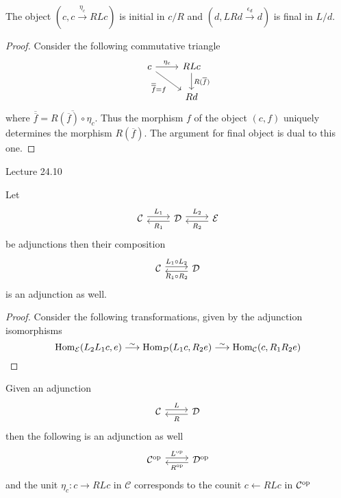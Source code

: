 \begin{prop}
\label{initial_final_comma_category}
    The object $(c,c \xrightarrow{\eta_c} RLc)$ is initial in $c/R$ and
    $(d, LRd \xrightarrow{\epsilon_d} d)$ is final in $L/d$.
\end{prop}

\begin{proof}
    Consider the following commutative triangle
        \[
        \begin{tikzcd}
            c 
            \arrow[r, " \eta_c "] 
            \arrow[rd, "\overline{\overline{f}}=f"']
            &
            RLc
            \arrow[d,"R(\overline{f})"]
            \\
            &
            Rd
        \end{tikzcd}
        \]
    where $\overline{\overline{f}}=\overline{R(\overline{f})\circ \eta_c}$. 
    Thus the morphism $f$ of the object $(c,f)$ uniquely determines the morphism $R(\overline{f})$. 
    The argument for final object is dual to this one.
\end{proof}

Lecture 24.10

\begin{prop}
    Let 
    \[
    \begin{tikzcd}
        \mathcal{C}
        \arrow[r, shift left, "L_1"]
        &
        \mathcal{D}
        \arrow[l, shift left, "R_1"]
        \arrow[r, shift left, "L_2"]
        &
        \mathcal{E}
        \arrow[l, shift left, "R_2"]
    \end{tikzcd}
    \]
    be adjunctions then their composition
    \[
    \begin{tikzcd}
        \mathcal{C}
        \arrow[r, shift left, "L_1\circ L_2"]
        &
        \mathcal{D}
        \arrow[l, shift left, "R_1\circ R_2"]
    \end{tikzcd}
    \]
    is an adjunction as well.
\end{prop}

\begin{proof}
Consider the following transformations, given by the adjunction isomorphisms
    \[
    \Hom_{\mathcal{E}}(L_2L_1c,e) \isomorphism \Hom_{\mathcal{D}}(L_1c,R_2e) \isomorphism \Hom_{\mathcal{C}}(c,R_1R_2e)
    \]
\end{proof}

\begin{rmk}
    Given an adjunction 
    \[
    \begin{tikzcd}
        \mathcal{C}
        \arrow[r, shift left, "L"]
        &
        \mathcal{D}
        \arrow[l, shift left, "R"]
    \end{tikzcd}
    \]
    then the following is an adjunction as well
    \[
    \begin{tikzcd}
        \mathcal{C^{\op}}
        \arrow[r, shift left, "L^{\op}"]
        &
        \mathcal{D^{\op}}
        \arrow[l, shift left, "R^{\op}"]
    \end{tikzcd}
    \]
    and the unit $\eta_c\colon c \to RLc$ in $\mathcal{C}$ corresponds to the counit $c \xleftarrow{}RLc$ in $\mathcal{C}^{\operatorname{op}}$
\end{rmk}

